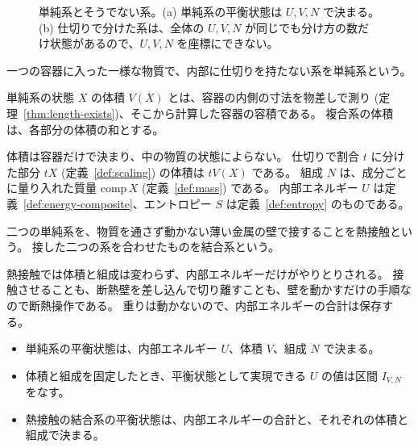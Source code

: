 \begin{figure}[htbp]
  \centering
  \caption{単純系とそうでない系。(a) 単純系の平衡状態は $U, V, N$ で決まる。(b) 仕切りで分けた系は、全体の $U, V, N$ が同じでも分け方の数だけ状態があるので、$U, V, N$ を座標にできない。}
  \label{fig:simple}
\end{figure}

\begin{definition}[単純系]
  \label{def:simple-system}
  一つの容器に入った一様な物質で、内部に仕切りを持たない系を単純系という。
\end{definition}

\begin{definition}[体積]
  \label{def:volume}
  単純系の状態 $X$ の体積 $V(X)$ とは、容器の内側の寸法を物差しで測り (定理~\ref{thm:length-exists})、そこから計算した容器の容積である。
  複合系の体積は、各部分の体積の和とする。
\end{definition}

体積は容器だけで決まり、中の物質の状態によらない。
仕切りで割合 $t$ に分けた部分 $tX$ (定義~\ref{def:scaling}) の体積は $t V(X)$ である。
組成 $N$ は、成分ごとに量り入れた質量 $\mathrm{comp}\, X$ (定義~\ref{def:mass}) である。
内部エネルギー $U$ は定義~\ref{def:energy-composite}、エントロピー $S$ は定義~\ref{def:entropy} のものである。

\begin{definition}[熱接触]
  \label{def:thermal-contact}
  二つの単純系を、物質を通さず動かない薄い金属の壁で接することを熱接触という。
  接した二つの系を合わせたものを結合系という。
\end{definition}

熱接触では体積と組成は変わらず、内部エネルギーだけがやりとりされる。
接触させることも、断熱壁を差し込んで切り離すことも、壁を動かすだけの手順なので断熱操作である。
重りは動かないので、内部エネルギーの合計は保存する。

\begin{empirical}[単純系の座標]
  \label{emp:coordinates}
  \begin{itemize}
    \item 単純系の平衡状態は、内部エネルギー $U$、体積 $V$、組成 $N$ で決まる。
    \item 体積と組成を固定したとき、平衡状態として実現できる $U$ の値は区間 $I_{V,N}$ をなす。
    \item 熱接触の結合系の平衡状態は、内部エネルギーの合計と、それぞれの体積と組成で決まる。
  \end{itemize}
\end{empirical}

